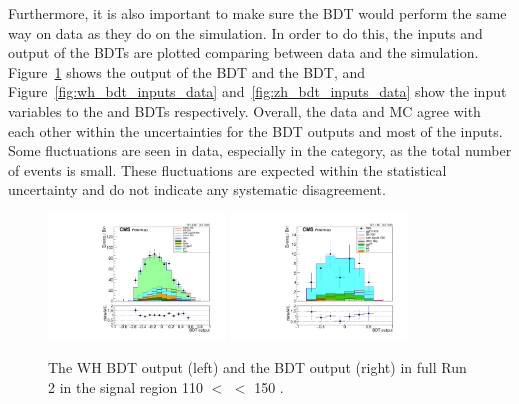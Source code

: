 Furthermore, it is also important to make sure the BDT would perform the same way on data as they do on the simulation.
In order to do this, the inputs and output of the BDTs are plotted comparing between data and the simulation.
Figure~\ref{fig:vh_bdt_output_data} shows the output of the \WH BDT and the \ZH BDT, 
and Figure~\ref{fig:wh_bdt_inputs_data} and~\ref{fig:zh_bdt_inputs_data} show the input variables to the \WH and \ZH BDTs respectively.
Overall, the data and MC agree with each other within the uncertainties for the BDT outputs and most of the inputs.
Some fluctuations are seen in data, especially in the \ZH category, as the total number of events is small. 
These fluctuations are expected within the statistical uncertainty and do not indicate any systematic disagreement.

\begin{figure}[!htb]
  \centering
  \captionsetup{justification=justified}
  \includegraphics[width=0.42\textwidth]{pics/VH_sec/valid_BDT_WH/BDT_final.pdf}
  \includegraphics[width=0.42\textwidth]{pics/VH_sec/valid_BDT_ZH/BDT_final.pdf}
  \caption{The WH BDT output (left) and the \ZH BDT output (right) in full Run 2 in the signal region 110 \GeV $<$ \mmm $<$ 150 \GeV.}
  \label{fig:vh_bdt_output_data}
\end{figure}

